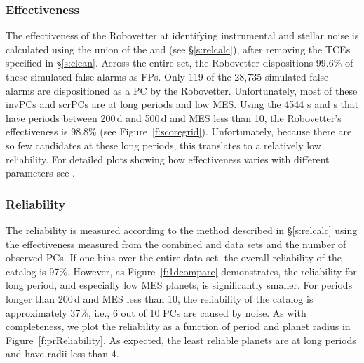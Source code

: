 \subsubsection{Effectiveness}
The effectiveness of the Robovetter at identifying instrumental and stellar noise is calculated using the union of the  and  (see \S\ref{s:relcalc}), after removing the TCEs specified in \S\ref{s:clean}. Across the entire set, the Robovetter dispositions 99.6\% of these simulated false alarms as FPs.  Only 119 of the 28,735 simulated false alarms are dispositioned as a PC by the Robovetter.  Unfortunately, most of these invPCs and scrPCs are at long periods and low MES. Using the 4544 \invtce s and \scrtce s that have periods between 200\,d and 500\,d and MES less than 10, the Robovetter's effectiveness is 98.8\% (see Figure~\ref{f:scoregrid}).  Unfortunately, because there are so few candidates at these long periods, this translates to a relatively low reliability.  For detailed plots showing how effectiveness varies with different parameters see \citet{Coughlin2017a}.


\subsubsection{Reliability}
\label{s:reliability}
The reliability is measured according to the method described in \S\ref{s:relcalc} using the effectiveness measured from the combined \scrtce{} and \invtce{} data sets and the number of observed PCs.  If one bins over the entire data set, the overall reliability of the catalog is 97\%. However, as Figure~\ref{f:1dcompare} demonstrates, the reliability for long period, and especially low MES planets, is significantly smaller.  For periods longer than 200\,d and MES less than 10, the reliability of the catalog is approximately 37\%, i.e., 6 out of 10 PCs are caused by noise. As with completeness, we plot the reliability as a function of period and planet radius in Figure~\ref{f:prReliability}. As expected, the least reliable planets are at long periods and have radii less than 4\re. 


